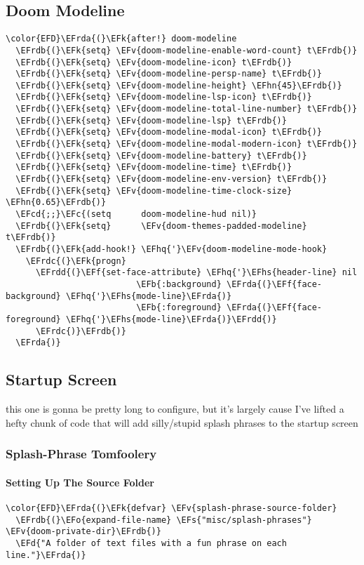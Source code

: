 \documentclass{article}
\newcommand{\EFc}[1]{\textcolor{EFc}{#1}} %
\newcommand{\EFcd}[1]{\textcolor{EFcd}{#1}} %
\newcommand{\EFs}[1]{\textcolor{EFs}{#1}} %
\newcommand{\EFd}[1]{\textcolor{EFd}{#1}} %
\newcommand{\EFk}[1]{\textcolor{EFk}{#1}} %
\newcommand{\EFb}[1]{\textcolor{EFb}{#1}} %
\newcommand{\EFf}[1]{\textcolor{EFf}{#1}} %
\newcommand{\EFv}[1]{\textcolor{EFv}{#1}} %
\newcommand{\EFo}[1]{\textcolor{EFo}{#1}} %
\newcommand{\EFhn}[1]{\textcolor{EFhn}{\textbf{#1}}} %
\newcommand{\EFhq}[1]{#1} %
\newcommand{\EFhs}[1]{\textcolor{EFhs}{#1}} %
\newcommand{\EFrda}[1]{\textcolor{EFrda}{#1}} %
\newcommand{\EFrdb}[1]{\textcolor{EFrdb}{#1}} %
\newcommand{\EFrdc}[1]{\textcolor{EFrdc}{#1}} %
\newcommand{\EFrdd}[1]{\textcolor{EFrdd}{#1}} %
\begin{document}
\subsection{Doom Modeline}
\label{sec:orgea5ca1b}
\begin{Code}
\begin{Verbatim}
\color{EFD}\EFrda{(}\EFk{after!} doom-modeline
  \EFrdb{(}\EFk{setq} \EFv{doom-modeline-enable-word-count} t\EFrdb{)}
  \EFrdb{(}\EFk{setq} \EFv{doom-modeline-icon} t\EFrdb{)}
  \EFrdb{(}\EFk{setq} \EFv{doom-modeline-persp-name} t\EFrdb{)}
  \EFrdb{(}\EFk{setq} \EFv{doom-modeline-height} \EFhn{45}\EFrdb{)}
  \EFrdb{(}\EFk{setq} \EFv{doom-modeline-lsp-icon} t\EFrdb{)}
  \EFrdb{(}\EFk{setq} \EFv{doom-modeline-total-line-number} t\EFrdb{)}
  \EFrdb{(}\EFk{setq} \EFv{doom-modeline-lsp} t\EFrdb{)}
  \EFrdb{(}\EFk{setq} \EFv{doom-modeline-modal-icon} t\EFrdb{)}
  \EFrdb{(}\EFk{setq} \EFv{doom-modeline-modal-modern-icon} t\EFrdb{)}
  \EFrdb{(}\EFk{setq} \EFv{doom-modeline-battery} t\EFrdb{)}
  \EFrdb{(}\EFk{setq} \EFv{doom-modeline-time} t\EFrdb{)}
  \EFrdb{(}\EFk{setq} \EFv{doom-modeline-env-version} t\EFrdb{)}
  \EFrdb{(}\EFk{setq} \EFv{doom-modeline-time-clock-size} \EFhn{0.65}\EFrdb{)}
  \EFcd{;;}\EFc{(setq      doom-modeline-hud nil)}
  \EFrdb{(}\EFk{setq}      \EFv{doom-themes-padded-modeline} t\EFrdb{)}
  \EFrdb{(}\EFk{add-hook!} \EFhq{'}\EFv{doom-modeline-mode-hook}
    \EFrdc{(}\EFk{progn}
      \EFrdd{(}\EFf{set-face-attribute} \EFhq{'}\EFhs{header-line} nil
                          \EFb{:background} \EFrda{(}\EFf{face-background} \EFhq{'}\EFhs{mode-line}\EFrda{)}
                          \EFb{:foreground} \EFrda{(}\EFf{face-foreground} \EFhq{'}\EFhs{mode-line}\EFrda{)}\EFrdd{)}
      \EFrdc{)}\EFrdb{)}
  \EFrda{)}
\end{Verbatim}
\end{Code}

\subsection{Startup Screen}
\label{sec:org4a25093}
this one is gonna be pretty long to configure, but it's largely cause I've lifted a hefty chunk of code that will add silly/stupid splash phrases to the startup screen
\subsubsection{Splash-Phrase Tomfoolery}
\label{sec:org3771d73}
\paragraph{Setting Up The Source Folder}
\label{sec:org221ea10}
\begin{Code}
\begin{Verbatim}
\color{EFD}\EFrda{(}\EFk{defvar} \EFv{splash-phrase-source-folder}
  \EFrdb{(}\EFo{expand-file-name} \EFs{"misc/splash-phrases"} \EFv{doom-private-dir}\EFrdb{)}
  \EFd{"A folder of text files with a fun phrase on each line."}\EFrda{)}
\end{Verbatim}
\end{Code}
\end{document}
